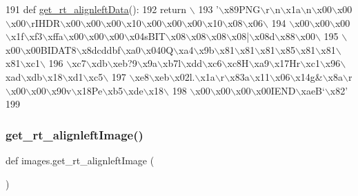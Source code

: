 \begin{DoxyCode}
191 \textcolor{keyword}{def }\hyperlink{namespaceimages_aca3df35d167083df9d30d2d01cb284d9}{get\_rt\_alignleftData}():
192     \textcolor{keywordflow}{return} \(\backslash\)
193 \textcolor{stringliteral}{'\(\backslash\)x89PNG\(\backslash\)r\(\backslash\)n\(\backslash\)x1a\(\backslash\)n\(\backslash\)x00\(\backslash\)x00\(\backslash\)x00\(\backslash\)rIHDR\(\backslash\)x00\(\backslash\)x00\(\backslash\)x00\(\backslash\)x10\(\backslash\)x00\(\backslash\)x00\(\backslash\)x00\(\backslash\)x10\(\backslash\)x08\(\backslash\)x06\(\backslash\)}
194 \textcolor{stringliteral}{\(\backslash\)x00\(\backslash\)x00\(\backslash\)x00\(\backslash\)x1f\(\backslash\)xf3\(\backslash\)xffa\(\backslash\)x00\(\backslash\)x00\(\backslash\)x00\(\backslash\)x04sBIT\(\backslash\)x08\(\backslash\)x08\(\backslash\)x08\(\backslash\)x08|\(\backslash\)x08d\(\backslash\)x88\(\backslash\)x00\(\backslash\)}
195 \textcolor{stringliteral}{\(\backslash\)x00\(\backslash\)x00BIDAT8\(\backslash\)x8dcddbf\(\backslash\)xa0\(\backslash\)x040Q\(\backslash\)xa4\(\backslash\)x9b\(\backslash\)x81\(\backslash\)x81\(\backslash\)x81\(\backslash\)x85\(\backslash\)x81\(\backslash\)x81\(\backslash\)x81\(\backslash\)xc1\(\backslash\)}
196 \textcolor{stringliteral}{\(\backslash\)xc7\(\backslash\)xdb\(\backslash\)xeb?9\(\backslash\)x9a\(\backslash\)xb7l\(\backslash\)xdd\(\backslash\)xc6\(\backslash\)xc8H\(\backslash\)xa9\(\backslash\)x17Hr\(\backslash\)xc1\(\backslash\)x96\(\backslash\)xad\(\backslash\)xdb\(\backslash\)x18\(\backslash\)xd1\(\backslash\)xc5\(\backslash\)}
197 \textcolor{stringliteral}{\(\backslash\)xe8\(\backslash\)xeb\(\backslash\)x02l.\(\backslash\)x1a\(\backslash\)r\(\backslash\)x83a\(\backslash\)x11\(\backslash\)x06\(\backslash\)x14g&\(\backslash\)x8a\(\backslash\)r\(\backslash\)x00\(\backslash\)x00\(\backslash\)x90v\(\backslash\)x18Pe\(\backslash\)xb5\(\backslash\)xde\(\backslash\)x18\(\backslash\)}
198 \textcolor{stringliteral}{\(\backslash\)x00\(\backslash\)x00\(\backslash\)x00\(\backslash\)x00IEND\(\backslash\)xaeB`\(\backslash\)x82'}
199 
\end{DoxyCode}
\mbox{\label{namespaceimages_ac5bb51ed178a2b8654577b5a450c2a95}} 
\subsubsection{\texorpdfstring{get\+\_\+rt\+\_\+alignleft\+Image()}{get\_rt\_alignleftImage()}}
{\footnotesize\ttfamily def images.\+get\+\_\+rt\+\_\+alignleft\+Image (\begin{DoxyParamCaption}{ }\end{DoxyParamCaption})}



